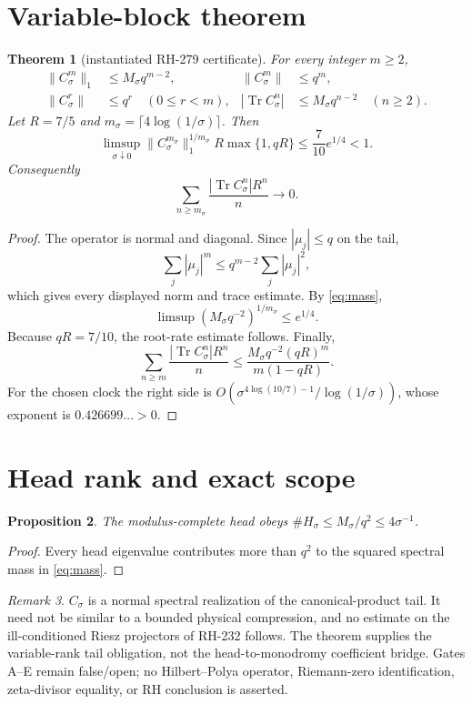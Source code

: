 \documentclass[11pt]{article}
\newtheorem{theorem}{Theorem}[section]
\newtheorem{proposition}[theorem]{Proposition}
\theoremstyle{remark}\newtheorem{remark}[theorem]{Remark}
\newcommand{\Tr}{\operatorname{Tr}}
\begin{document}
\section{Variable-block theorem}
\begin{theorem}[instantiated RH-279 certificate]\label{thm:certificate}
For every integer $m\ge2$,
\begin{align}
 \|C_\sigma^m\|_1&\le M_\sigma q^{m-2},&
 \|C_\sigma^m\|&\le q^m,\\
 \|C_\sigma^r\|&\le q^r\quad(0\le r<m),&
 |\Tr C_\sigma^n|&\le M_\sigma q^{n-2}\quad(n\ge2).
\end{align}
Let $R=7/5$ and $m_\sigma=\lceil4\log(1/\sigma)\rceil$.  Then
\[
 \limsup_{\sigma\downarrow0}
 \|C_\sigma^{m_\sigma}\|_1^{1/m_\sigma}R
 \max\{1,qR\}
 \le \frac7{10}e^{1/4}<1.
\]
Consequently
\begin{equation}\label{eq:tail}
 \sum_{n\ge m_\sigma}
 \frac{|\Tr C_\sigma^n|R^n}{n}\longrightarrow0.
\end{equation}
\end{theorem}
\begin{proof}
The operator is normal and diagonal.  Since $|\mu_j|\le q$ on the tail,
\[
 \sum_j|\mu_j|^m\le q^{m-2}\sum_j|\mu_j|^2,
\]
which gives every displayed norm and trace estimate.  By
\eqref{eq:mass},
\[
 \limsup (M_\sigma q^{-2})^{1/m_\sigma}\le e^{1/4}.
\]
Because $qR=7/10$, the root-rate estimate follows.  Finally,
\[
 \sum_{n\ge m}\frac{|\Tr C_\sigma^n|R^n}{n}
 \le \frac{M_\sigma q^{-2}(qR)^m}{m(1-qR)}.
\]
For the chosen clock the right side is
$O(\sigma^{4\log(10/7)-1}/\log(1/\sigma))$, whose exponent is
$0.426699\ldots>0$.
\end{proof}

\section{Head rank and exact scope}
\begin{proposition}
The modulus-complete head obeys
$\#H_\sigma\le M_\sigma/q^2\le4\sigma^{-1}$.
\end{proposition}
\begin{proof}
Every head eigenvalue contributes more than $q^2$ to the squared spectral
mass in \eqref{eq:mass}.
\end{proof}

\begin{remark}
$C_\sigma$ is a normal spectral realization of the canonical-product tail.
It need not be similar to a bounded physical compression, and no estimate on
the ill-conditioned Riesz projectors of RH-232 follows.  The theorem supplies
the variable-rank tail obligation, not the head-to-monodromy coefficient
bridge.  Gates A--E remain false/open; no Hilbert--Polya operator, Riemann-zero
identification, zeta-divisor equality, or RH conclusion is asserted.
\end{remark}
\end{document}
